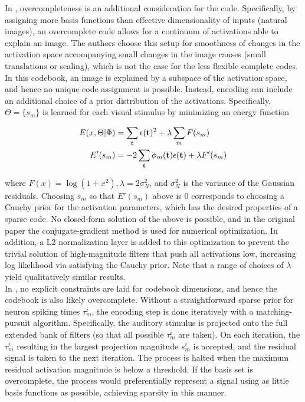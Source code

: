 \documentclass[
	a4paper, %
	11pt, %
	unnumberedsections, %
]{LTJournalArticle}
\begin{document}
In \textcite{olshausenSparseCodingOvercomplete1997}, overcompleteness is an additional consideration for the code. Specifically, by assigning more basis functions than effective dimensionality of inputs (natural images), an overcomplete code allows for a continuum of activations able to explain an image. The authors choose this setup for smoothness of changes in the activation space accompanying small changes in the image causes (small translations or scaling), which is not the case for the less flexible complete codes. In this codebook, an image is explained by a subspace of the activation space, and hence no unique code assignment is possible. Instead, encoding can include an additional choice of a prior distribution of the activations. Specifically, $\Theta = \{s_m\}$ is learned for each visual stimulus by minimizing an energy function 
 \begin{center}
  \begin{align}
    E(x, \Theta | \Phi) & = \sum_{\mathbf{t}}\epsilon(\mathbf{t})^2 + \lambda\sum_mF(s_m)\notag\\
    E'(s_m) &= -2\sum_{\mathbf{t}}\phi_m(\mathbf{t})\epsilon(\mathbf{t}) + \lambda F'(s_m)
  \end{align}
 \end{center}
where $F(x) = \log(1 + x^2), \lambda = 2\sigma_N^2$, and $\sigma_N^2$ is the variance of the Gaussian residuals. Choosing $s_m$ so that $E'(s_m)$ above is 0 corresponds to choosing a Cauchy prior for the activation parameters, which has the desired properties of a sparse code. No closed-form solution of the above is possible, and in the original paper the conjugate-gradient method is used for numerical optimization. In addition, a L2 normalization layer is added to this optimization to prevent the trivial solution of high-magnitude filters that push all activations low, increasing log likelihood via satisfying the Cauchy prior. Note that a range of choices of $\lambda$ yield qualitatively similar results. \\

In \textcite{smithEfficientAuditoryCoding2006}, no explicit constraints are laid for codebook dimensions, and hence the codebook is also likely overcomplete. Without a straightforward sparse prior for neuron spiking times $\tau_m^i$, the encoding step is done iteratively with a matching-pursuit algorithm. Specifically, the auditory stimulus is projected onto the full extended bank of filters (so that all possible $\tau_m^i$ are taken). On each iteration, the $\tau_m^i$ resulting in the largest projection magnitude $s_m^i$ is accepted, and the residual signal is taken to the next iteration. The process is halted when the maximum residual activation magnitude is below a threshold. If the basis set is overcomplete, the process would preferentially represent a signal using as little basis functions as possible, achieving sparsity in this manner. 
\end{document}
